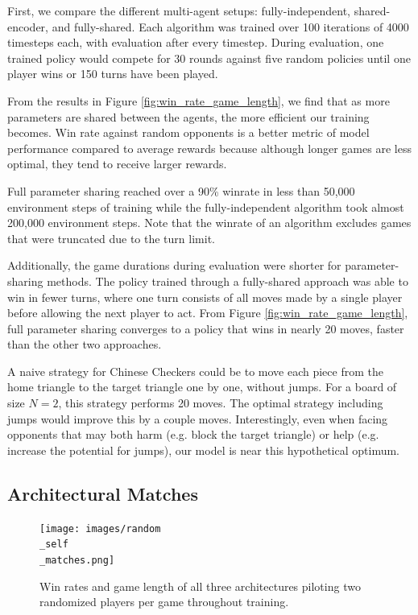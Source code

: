 \documentclass[12pt, a4paper, twocolumn]{article}
\begin{document}
First, we compare the different multi-agent setups: fully-independent, shared-encoder, and fully-shared. Each algorithm was trained over 100 iterations of 4000 timesteps each, with evaluation after every timestep. During evaluation, one trained policy would compete for 30 rounds against five random policies until one player wins or 150 turns have been played.


From the results in Figure \ref{fig:win_rate_game_length}, we find that as more parameters are shared between the agents, the more efficient our training becomes. Win rate against random opponents is a better metric of model performance compared to average rewards because although longer games are less optimal, they tend to receive larger rewards.

Full parameter sharing reached over a 90\% winrate in less than 50,000 environment steps of training while the fully-independent algorithm took almost 200,000 environment steps. Note that the winrate of an algorithm excludes games that were truncated due to the turn limit.

Additionally, the game durations during evaluation were shorter for parameter-sharing methods. The policy trained through a fully-shared approach was able to win in fewer turns, where one turn consists of all moves made by a single player before allowing the next player to act. From Figure \ref{fig:win_rate_game_length}, full parameter sharing converges to a policy that wins in nearly 20 moves, faster than the other two approaches.

A naive strategy for Chinese Checkers could be to move each piece from the home triangle to the target triangle one by one, without jumps. For a board of size $N = 2$, this strategy performs 20 moves. The optimal strategy including jumps would improve this by a couple moves. Interestingly, even when facing opponents that may both harm (e.g. block the target triangle) or help (e.g. increase the potential for jumps), our model is near this hypothetical optimum.

\subsection{Architectural Matches}

\begin{figure}[]
  \centering
    \texttt{[image: images/random\\\_self\\\_matches.png]}
  \caption{Win rates and game length of all three architectures piloting two randomized players per game throughout training.}\label{fig:archmatches}
\end{figure}
\end{document}
